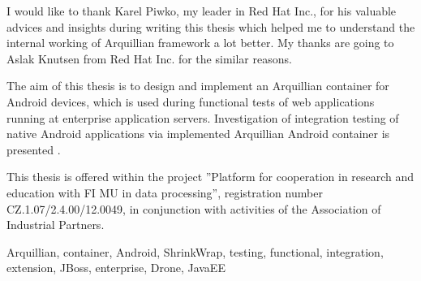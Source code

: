 \documentclass[12pt,final,oneside]{fithesis}
\begin{document}
\newcommand{\bb}[1]{\textbf{#1}}
\newcommand{\code}[1]{\emph{#1}}
\newcommand{\n}{\lstinline|\n|}


\lstset{language=Awk}
\lstset{frame=single}
\lstset{framesep=10pt}
\lstset{upquote=true}
\lstset{basicstyle=\ttfamily}


\FrontMatter
\ThesisTitlePage

\begin{ThesisDeclaration}
\DeclarationText
\AdvisorName
\end{ThesisDeclaration}

\begin{ThesisThanks}
I would like to thank Karel Piwko, my leader in Red Hat Inc., for his valuable advices and insights during writing this thesis which helped me to understand the internal working of Arquillian framework a lot better. My thanks are going to Aslak Knutsen from Red Hat Inc. for the similar reasons.
\end{ThesisThanks}

\begin{ThesisAbstract}
The aim of this thesis is to design and implement an Arquillian container for Android devices, which is used during functional tests of web applications running at enterprise application servers. Investigation of integration testing of native Android applications via implemented Arquillian Android container is presented	.

This thesis is offered within the project ''Platform for cooperation in research and education with FI
MU in data processing'', registration number CZ.1.07/2.4.00/12.0049, in conjunction with activities of
the Association of Industrial Partners.
\end{ThesisAbstract}

\begin{ThesisKeyWords}
Arquillian, container, Android, ShrinkWrap, testing, functional, integration, extension, JBoss, enterprise, Drone, JavaEE
\end{ThesisKeyWords}

\clearpage
\thispagestyle{plain}
\par{}
\end{document}

